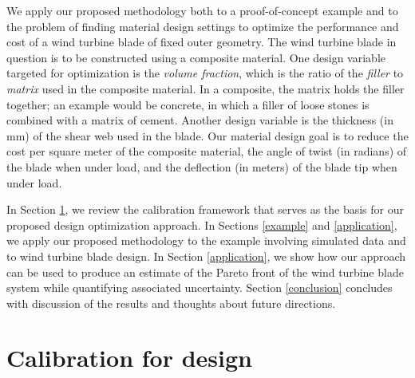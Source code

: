 \documentclass[12pt]{article}
\begin{document}
%
We apply our proposed methodology both to a proof-of-concept example and to the problem of finding material design settings to optimize the performance and cost of a wind turbine blade of fixed outer geometry.
%
The wind turbine blade in question is to be constructed using a composite material.
%
One design variable targeted for optimization is the \emph{volume fraction}, which is the ratio of the \emph{filler} to \emph{matrix} used in the composite material.
%
In a composite, the matrix holds the filler together; an example would be concrete, in which a filler of loose stones is combined with a matrix of cement.
%
Another design variable is the thickness (in mm) of the shear web used in the blade.
%
Our material design goal is to reduce the cost per square meter of the composite material, the angle of twist (in radians) of the blade when under load, and the deflection (in meters) of the blade tip when under load.
%

%
In Section \ref{calib_for_design}, we review the calibration framework that serves as the basis for our proposed design optimization approach. 
%
In Sections \ref{example} and \ref{application}, we apply our proposed methodology to the example involving simulated data and to wind turbine blade design.
%
In Section \ref{application}, we show how our approach can be used to produce an estimate of the Pareto front of the wind turbine blade system while quantifying associated uncertainty.
%
Section \ref{conclusion} concludes with discussion of the results and thoughts about future directions.

%
\section{Calibration for design}\label{calib_for_design}

%
\end{document}
